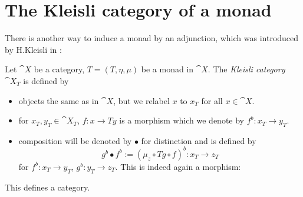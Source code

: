 \section{The Kleisli category of a monad}
There is another way to induce a monad by an adjunction, which was introduced by H.Kleisli in \cite{kleisli}:
\begin{definition}
    Let $\cat{X}$ be a category, $T = (T,\eta, \mu)$ be a monad in $\cat{X}$.
    The \textit{Kleisli category $\cat{X}_T$} is defined by
    \begin{itemize}
        \item objects the same as in $\cat{X}$, but we relabel $x$ to $x_T$ for all $x \in \cat{X}$.
        \item for $x_T, y_T \in \cat{X}_T$, $f\colon x \to Ty$ is a morphism which we
        denote by $f^b \colon x_T \to y_T$.
        \item composition will be denoted by $\bullet$ for distinction and is defined by
        \[
            g^b \bullet f^b := (\mu_z \circ Tg \circ f)^b \colon x_T \to z_T
        \]
        for $f^b \colon x_T \to y_T$, $g^b \colon y_T \to z_T$. 
        This is indeed again a morphism:
    \end{itemize}
\end{definition}
\begin{claim*}
    This defines a category.
\end{claim*}
